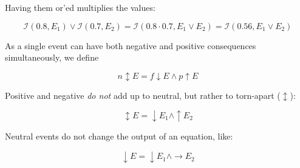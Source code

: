 \documentclass{scrartcl}
\begin{document}
Having them or'ed multiplies the values:

\begin{equation} \mathcal{I}(0.8, E_1) \lor \mathcal{I}(0.7, E_2) = \mathcal{I}\left(0.8 \cdot 0.7, E_1 \lor E_2\right) = \mathcal{I}(0.56, E_1 \lor E_2)\end{equation}

As a single event can have both negative and positive consequences simultaneously, we define

\begin{equation}n \updownarrow E = f \downarrow E \wedge p \uparrow E\end{equation}

Positive and negative \textit{do not} add up to neutral, but rather to torn-apart ($\updownarrow$):

\begin{equation}\updownarrow E = \downarrow E_1 \wedge \uparrow E_2\end{equation}

Neutral events do not change the output of an equation, like:

\begin{equation}\downarrow E = \downarrow E_1 \wedge \rightarrow E_2\end{equation}
\end{document}
